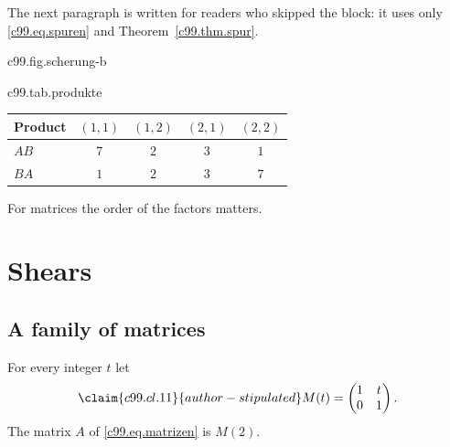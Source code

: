 The next paragraph is written for readers who skipped the block: it uses only
\eqref{c99.eq.spuren} and Theorem~\ref{c99.thm.spur}.

\begin{tpcfigure}{c99.fig.scherung-b}
  \caption{The matrix $B$ as a map: $(x,y)$ goes to $(x,\,3x+y)$. A second
    figure with a demo on the same page.}
\end{tpcfigure}

\begin{tpctable}{c99.tab.produkte}
  \caption{The entries of the two products of \eqref{c99.eq.ab} and \eqref{c99.eq.ba}.}
  \begin{tabular}{lcccc}
    \toprule
    Product & $(1,1)$ & $(1,2)$ & $(2,1)$ & $(2,2)$ \\
    \midrule
    $AB$ & $7$ & $2$ & $3$ & $1$ \\
    $BA$ & $1$ & $2$ & $3$ & $7$ \\
    \bottomrule
  \end{tabular}
\end{tpctable}

\begin{merksatz}
  For matrices the order of the factors matters.
\end{merksatz}

\section{Shears}\label{c99.s2}

\subsection{A family of matrices}\label{c99.s2.1}

For every integer $t$ let
\begin{equation}\label{c99.eq.scherung}\claim{c99.cl.11}{author-stipulated}
  M(t) = \begin{pmatrix} 1 & t \\ 0 & 1 \end{pmatrix}.
\end{equation}
The matrix $A$ of \eqref{c99.eq.matrizen} is $M(2)$.

